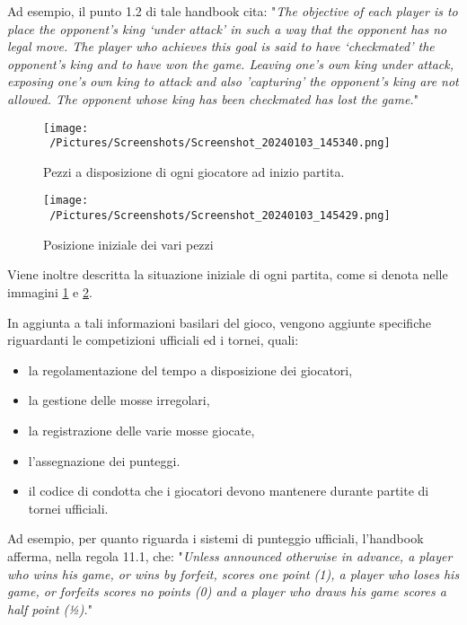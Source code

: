 \documentclass[12pt]{book}
\begin{document}
Ad esempio, il punto 1.2 di tale handbook cita: "\textit{The objective of each player is to place the opponent’s king ‘under attack’ in such a way
that the opponent has no legal move. The player who achieves this goal is said to have
‘checkmated’ the opponent’s king and to have won the game. Leaving one’s own king
under attack, exposing one’s own king to attack and also ’capturing’ the opponent’s king
are not allowed. The opponent whose king has been checkmated has lost
the game.}"

\begin{figure}[h]
  \caption{Pezzi a disposizione di ogni giocatore ad inizio partita.}
  \centering
  \label{fig:pezzi_inizio}
  \texttt{[image: ~/Pictures/Screenshots/Screenshot\_20240103\_145340.png]}
\end{figure} 

\begin{figure}[h]
  \caption{Posizione iniziale dei vari pezzi}
  \centering
  \label{fig:inizio_scacchiera}
  \texttt{[image: ~/Pictures/Screenshots/Screenshot\_20240103\_145429.png]}
\end{figure} 

Viene inoltre descritta la situazione iniziale di ogni partita, come
si denota nelle immagini \ref{fig:pezzi_inizio} e \ref{fig:inizio_scacchiera}.

In aggiunta a tali informazioni basilari del gioco, vengono aggiunte
specifiche riguardanti le competizioni ufficiali ed i tornei, quali:

\begin{itemize}
  \item la regolamentazione del tempo a disposizione dei
    giocatori, 
  \item la gestione delle mosse irregolari, 
  \item la registrazione delle varie mosse giocate, 
  \item l'assegnazione dei punteggi.
  \item il codice di condotta che i giocatori devono mantenere durante
    partite di tornei ufficiali.

\end{itemize}

Ad esempio, per quanto riguarda i sistemi di punteggio ufficiali,
l'handbook afferma, nella regola 11.1, che: "\textit{Unless announced otherwise in advance, a player who wins his game, or wins by forfeit,
scores one point (1), a player who loses his game, or forfeits scores no points (0) and a
player who draws his game scores a half point (½).}"
\end{document}
